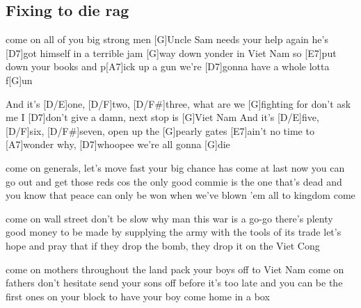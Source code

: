 \subsection*{Fixing to die rag   }
\begin{guitar}
[D7]come on all of you big strong men
[G]Uncle Sam needs your help again
he's [D7]got himself in a terrible jam
[G]way down yonder in Viet Nam so
[E7]put down your books and p[A7]ick up a gun we're
[D7]gonna have a whole lotta f[G]un



And it's [D/E]one, [D/F]two, [D/F#]three, what are we [G]fighting for
don't ask me I [D7]don't give a damn, next stop is [G]Viet Nam
And it's [D/E]five, [D/F]six, [D/F#]seven, open up the [G]pearly gates
[E7]ain't no time to [A7]wonder why, [D7]whoopee we're all gonna [G]die



come on generals, let's move fast
your big chance has come at last
now you can go out and get those reds
cos the only good commie is the one that's dead and
you know that peace can only be won when we've
blown 'em all to kingdom come



come on wall street don't be slow
why man this war is a go-go
there's plenty good money to be made by
supplying the army with the tools of its trade
let's hope and pray that if they drop the bomb,
they drop it on the Viet Cong



come on mothers throughout the land
pack your boys off to Viet Nam
come on fathers don't hesitate
send your sons off before it's too late
and you can be the first ones on your block
to have your boy come home in a box
\end{guitar}
